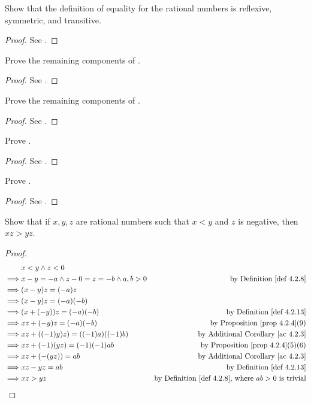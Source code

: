 \begin{exercise} \label{exercise 4.2.1}
Show that the definition of equality for the rational numbers is reflexive, symmetric, and transitive.
\end{exercise}
\begin{proof}
See .
\end{proof}

\begin{exercise} \label{exercise 4.2.2}
Prove the remaining components of .
\end{exercise}
\begin{proof}
See .
\end{proof}

\begin{exercise} \label{exercise 4.2.3}
Prove the remaining components of .
\end{exercise}
\begin{proof}
See .
\end{proof}

\begin{exercise} \label{exercise 4.2.4}
Prove .
\end{exercise}
\begin{proof}
See .
\end{proof}

\begin{exercise}\label{exercise 4.2.5}
Prove .
\end{exercise}
\begin{proof}
See .
\end{proof}

\begin{exercise}\label{exercise 4.2.6}
Show that if \(x, y, z\) are rational numbers such that \(x < y\) and \(z\) is negative, then \(xz > yz\).
\end{exercise}
\begin{proof}
\begin{align*}
                 & x < y \land z < 0 \\
        \implies & x - y = -a \land z - 0 = z = -b \land a, b > 0 & \text{by \DEF{4.2.8}}\\
        \implies & (x - y)z = (-a)z \\
        \implies & (x - y)z = (-a)(-b) \\
        \implies & (x + (-y))z = (-a)(-b) & \text{by \DEF{4.2.13}} \\
        \implies & xz + (-y)z = (-a)(-b) & \text{by \PROP{4.2.4}(9)} \\
        \implies & xz + ((-1)y)z) = ((-1)a)((-1)b) & \text{by \AC{4.2.3}} \\
        \implies & xz + (-1)(yz) = (-1)(-1)ab & \text{by \PROP{4.2.4}(5)(6)} \\
        \implies & xz + (-(yz)) = ab & \text{by \AC{4.2.3}} \\
        \implies & xz - yz = ab & \text{by \DEF{4.2.13}} \\
        \implies & xz > yz & \text{by \DEF{4.2.8}, where \(ab > 0\) is trivial}
    \end{align*}
\end{proof}
